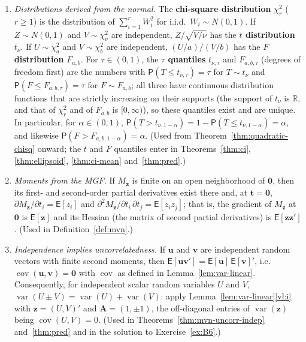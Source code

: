 \documentclass[12pt,a4paper]{article}
\theoremstyle{definition}
\newcommand\expc{\mathsf{E}}
\newcommand\prb{\mathsf{P}}
\DeclareMathOperator\var{var}
\DeclareMathOperator\cov{cov}
\newcommand{\bzero}{\mathbf{0}}
\newcommand{\bz}{\mathbf{z}}
\newcommand{\bA}{\mathbf{A}}
\newcommand{\bv}{\mathbf{v}}
\newcommand{\Real}{\mathbb{R}}
\newcommand{\bu}{\mathbf{u}}
\begin{document}
\begin{enumerate}[label=\textup{(N\arabic*)}]
\item\label{N5} \emph{Distributions derived from the normal.} The \textbf{chi-square distribution} $\chi^2_r$ ($r \geqslant 1$) is the distribution of $\sum_{i=1}^r W_i^2$ for i.i.d.\ $W_i \sim N(0,1)$. If $Z \sim N(0,1)$ and $V \sim \chi^2_\nu$ are independent, $Z/\sqrt{V/\nu}$ has the \textbf{$t$ distribution} $t_\nu$. If $U \sim \chi^2_a$ and $V \sim \chi^2_b$ are independent, $(U/a)/(V/b)$ has the \textbf{$F$ distribution} $F_{a,b}$. For $\tau \in (0,1)$, the \textbf{$\tau$ quantiles} $t_{\nu,\tau}$ and $F_{a,b,\tau}$ (degrees of freedom first) are the numbers with $\prb(T \leqslant t_{\nu,\tau}) = \tau$ for $T \sim t_\nu$ and $\prb(F \leqslant F_{a,b,\tau}) = \tau$ for $F \sim F_{a,b}$; all three have continuous distribution functions that are strictly increasing on their supports (the support of $t_\nu$ is $\Real$, and that of $\chi^2_r$ and of $F_{a,b}$ is $[0, \infty)$), so these quantiles exist and are unique. In particular, for $\alpha \in (0,1)$, $\prb(T > t_{\nu,1-\alpha}) = 1 - \prb(T \leqslant t_{\nu,1-\alpha}) = \alpha$, and likewise $\prb(F > F_{a,b,1-\alpha}) = \alpha$. (Used from Theorem~\ref{thm:quadratic-chisq} onward; the $t$ and $F$ quantiles enter in Theorems~\ref{thm:ci}, \ref{thm:ellipsoid}, \ref{thm:ci-mean} and~\ref{thm:pred}.)
\item\label{N6} \emph{Moments from the MGF.} If $M_{\bz}$ is finite on an open neighborhood of $\bzero$, then its first- and second-order partial derivatives exist there and, at $\mathbf{t} = \bzero$, $\partial M_{\bz}/\partial t_i = \expc[z_i]$ and $\partial^2 M_{\bz}/\partial t_i\,\partial t_j = \expc[z_iz_j]$; that is, the gradient of $M_{\bz}$ at $\bzero$ is $\expc[\bz]$ and its Hessian (the matrix of second partial derivatives) is $\expc[\bz\bz']$. (Used in Definition~\ref{def:mvn}.)
\item\label{N7} \emph{Independence implies uncorrelatedness.} If $\bu$ and $\bv$ are independent random vectors with finite second moments, then $\expc[\bu\bv'] = \expc[\bu]\,\expc[\bv]'$, i.e.\ $\cov(\bu, \bv) = \bzero$ with $\cov$ as defined in Lemma~\ref{lem:var-linear}. Consequently, for independent scalar random variables $U$ and $V$, $\var(U \pm V) = \var(U) + \var(V)$: apply Lemma~\ref{lem:var-linear}\ref{vl:i} with $\bz = (U, V)'$ and $\bA = (1, \pm 1)$, the off-diagonal entries of $\var(\bz)$ being $\cov(U, V) = 0$. (Used in Theorems~\ref{thm:mvn-uncorr-indep} and~\ref{thm:pred} and in the solution to Exercise~\ref{ex:B6}.)
\end{enumerate}
\end{document}
